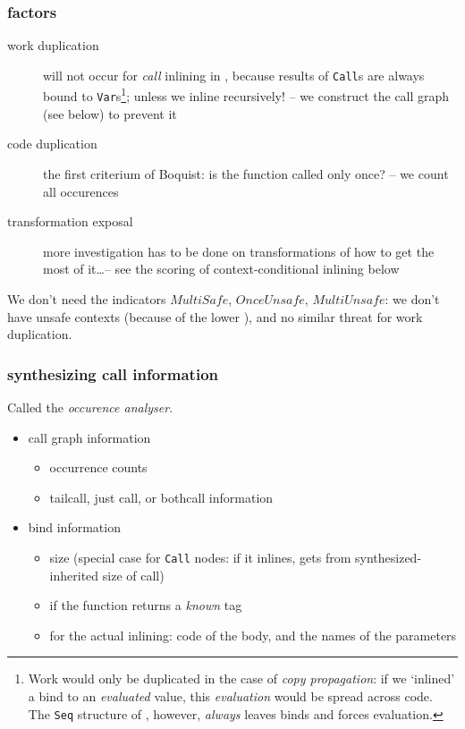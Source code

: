 \documentclass{article}
\begin{document}
\subsubsection{factors}
\begin{description}
\item[work duplication] will not occur for \emph{call} inlining in \grin, because results of \texttt{Call}s are always bound to \texttt{Var}s\footnote{Work would only be duplicated in the case of \emph{copy propagation}: if we `inlined' a bind to an \emph{evaluated} value, this \emph{evaluation} would be spread across code. The \texttt{Seq} structure of \grin, however, \emph{always} leaves binds and forces evaluation.}; unless we inline recursively! -- we construct the call graph (see below) to prevent it
\item[code duplication] the first criterium of Boquist: is the function called only once? -- we count all occurences
\item[transformation exposal] more investigation has to be done on \grin transformations of how to get the most of it\ldots -- see the scoring of context-conditional inlining below
\end{description}

We don't need the indicators $MultiSafe$, $OnceUnsafe$, $MultiUnsafe$: we don't have unsafe contexts (because of the lower \grin), and no similar threat for work duplication.

\subsubsection{synthesizing call information}
Called the \emph{occurence analyser}.

\begin{itemize}
\item call graph information
\begin{itemize}
\item occurrence counts
\item tailcall, just call, or bothcall information
\end{itemize}
\item bind information
\begin{itemize}
\item size (special case for \texttt{Call} nodes: if it inlines, gets from synthesized-inherited size of call)
\item if the function returns a \emph{known} tag
\item for the actual inlining: code of the body, and the names of the parameters
\end{itemize}
\end{itemize}
\end{document}
